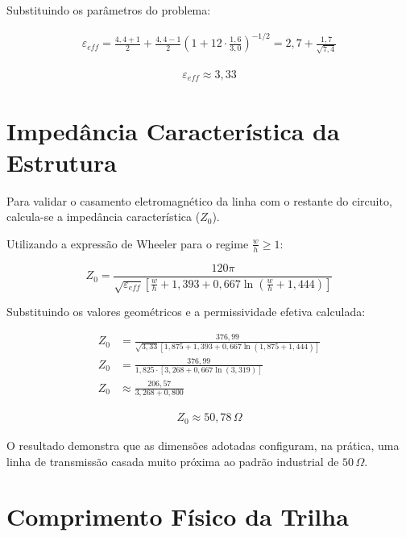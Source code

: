 \documentclass[12pt,a4paper]{report}
\begin{document}
Substituindo os parâmetros do problema:

\begin{align*}
\varepsilon_{eff} = 
\frac{4,4+1}{2} + \frac{4,4-1}{2}\left(1+12\cdot\frac{1,6}{3,0}\right)^{-1/2} = 
2,7 + \frac{1,7}{\sqrt{7,4}}
\end{align*}

\begin{align*}
\boxed{
\varepsilon_{eff} \approx 3,33
}
\end{align*}

\newpage

\section{Impedância Característica da Estrutura}

Para validar o casamento eletromagnético da linha com o restante do circuito, calcula-se a impedância característica ($Z_0$). 

Utilizando a expressão de Wheeler para o regime $\frac{w}{h} \ge 1$:

\begin{equation}
\boxed{
Z_0 = \frac{120\pi}{\sqrt{\varepsilon_{eff}} \left[ \frac{w}{h} + 1,393 + 0,667 \ln\left(\frac{w}{h} + 1,444\right) \right]}
}
\end{equation}

Substituindo os valores geométricos e a permissividade efetiva calculada:

\begin{align*}
Z_0 &= \frac{376,99}{\sqrt{3,33} \left[ 1,875 + 1,393 + 0,667 \ln\left(1,875 + 1,444\right) \right]} \\
Z_0 &= \frac{376,99}{1,825 \cdot \left[ 3,268 + 0,667 \ln(3,319) \right]} \\
Z_0 &\approx \frac{206,57}{3,268 + 0,800}
\end{align*}

\begin{align*}
\boxed{
Z_0 \approx 50,78\,\Omega
}
\end{align*}

O resultado demonstra que as dimensões adotadas configuram, na prática, uma linha de transmissão casada muito próxima ao padrão industrial de $50\,\Omega$.

\newpage

\section{Comprimento Físico da Trilha}
\end{document}
